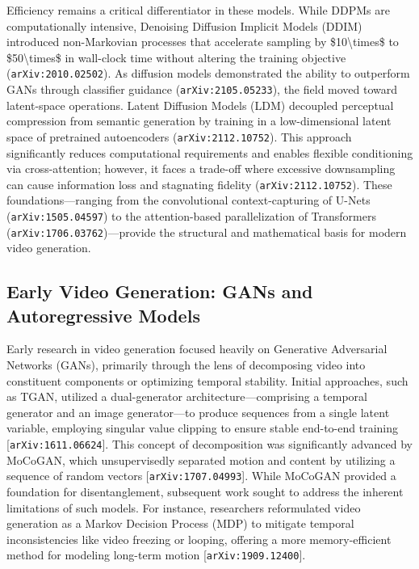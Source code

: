\documentclass[11pt]{article}
\begin{document}
Efficiency remains a critical differentiator in these models. While DDPMs are computationally intensive, Denoising Diffusion Implicit Models (DDIM) introduced non-Markovian processes that accelerate sampling by \$10\textbackslash{}times\$ to \$50\textbackslash{}times\$ in wall-clock time without altering the training objective (\texttt{arXiv:2010.02502}). As diffusion models demonstrated the ability to outperform GANs through classifier guidance (\texttt{arXiv:2105.05233}), the field moved toward latent-space operations. Latent Diffusion Models (LDM) decoupled perceptual compression from semantic generation by training in a low-dimensional latent space of pretrained autoencoders (\texttt{arXiv:2112.10752}). This approach significantly reduces computational requirements and enables flexible conditioning via cross-attention; however, it faces a trade-off where excessive downsampling can cause information loss and stagnating fidelity (\texttt{arXiv:2112.10752}). These foundations—ranging from the convolutional context-capturing of U-Nets (\texttt{arXiv:1505.04597}) to the attention-based parallelization of Transformers (\texttt{arXiv:1706.03762})—provide the structural and mathematical basis for modern video generation.

\subsection{Early Video Generation: GANs and Autoregressive Models}

Early research in video generation focused heavily on Generative Adversarial Networks (GANs), primarily through the lens of decomposing video into constituent components or optimizing temporal stability. Initial approaches, such as TGAN, utilized a dual-generator architecture—comprising a temporal generator and an image generator—to produce sequences from a single latent variable, employing singular value clipping to ensure stable end-to-end training [\texttt{arXiv:1611.06624}]. This concept of decomposition was significantly advanced by MoCoGAN, which unsupervisedly separated motion and content by utilizing a sequence of random vectors [\texttt{arXiv:1707.04993}]. While MoCoGAN provided a foundation for disentanglement, subsequent work sought to address the inherent limitations of such models. For instance, researchers reformulated video generation as a Markov Decision Process (MDP) to mitigate temporal inconsistencies like video freezing or looping, offering a more memory-efficient method for modeling long-term motion [\texttt{arXiv:1909.12400}].
\end{document}
